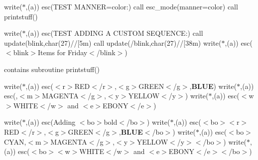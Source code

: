 write($\ast$,\textquotesingle{}(a)\textquotesingle{}) esc(\textquotesingle{}T\+E\+ST M\+A\+N\+N\+ER=color\+:\textquotesingle{}) call esc\+\_\+mode(manner=\textquotesingle{}color\textquotesingle{}) call printstuff()

write($\ast$,\textquotesingle{}(a)\textquotesingle{}) esc(\textquotesingle{}T\+E\+ST A\+D\+D\+I\+NG A C\+U\+S\+T\+OM S\+E\+Q\+U\+E\+N\+CE\+:\textquotesingle{}) call update(\textquotesingle{}blink\textquotesingle{},char(27)//\textquotesingle{}\mbox{[}5m\textquotesingle{}) call update(\textquotesingle{}/blink\textquotesingle{},char(27)//\textquotesingle{}\mbox{[}38m\textquotesingle{}) write($\ast$,\textquotesingle{}(a)\textquotesingle{}) esc(\textquotesingle{}$<$blink$>$Items for Friday$<$/blink$>$\textquotesingle{})

contains subroutine printstuff()

write($\ast$,\textquotesingle{}(a)\textquotesingle{}) esc(\textquotesingle{}$<$r$>$R\+ED$<$/r$>$,$<$g$>$G\+R\+E\+EN$<$/g$>$,{\bfseries B\+L\+UE}\textquotesingle{}) write($\ast$,\textquotesingle{}(a)\textquotesingle{}) esc(,$<$m$>$M\+A\+G\+E\+N\+TA$<$/g$>$,$<$y$>$Y\+E\+L\+L\+OW$<$/y$>$\textquotesingle{}) write($\ast$,\textquotesingle{}(a)\textquotesingle{}) esc(\textquotesingle{}$<$w$>$W\+H\+I\+TE$<$/w$>$ and $<$e$>$E\+B\+O\+NY$<$/e$>$\textquotesingle{})

write($\ast$,\textquotesingle{}(a)\textquotesingle{}) esc(\textquotesingle{}Adding $<$bo$>$bold$<$/bo$>$\textquotesingle{}) write($\ast$,\textquotesingle{}(a)\textquotesingle{}) esc(\textquotesingle{}$<$bo$>$$<$r$>$R\+ED$<$/r$>$,$<$g$>$G\+R\+E\+EN$<$/g$>$,{\bfseries B\+L\+UE}$<$/bo$>$\textquotesingle{}) write($\ast$,\textquotesingle{}(a)\textquotesingle{}) esc(\textquotesingle{}$<$bo$>${\ttfamily C\+Y\+AN},$<$m$>$M\+A\+G\+E\+N\+TA$<$/g$>$,$<$y$>$Y\+E\+L\+L\+OW$<$/y$>$$<$/bo$>$\textquotesingle{}) write($\ast$,\textquotesingle{}(a)\textquotesingle{}) esc(\textquotesingle{}$<$bo$>$$<$w$>$W\+H\+I\+TE$<$/w$>$ and $<$e$>$E\+B\+O\+NY$<$/e$>$$<$/bo$>$\textquotesingle{})

